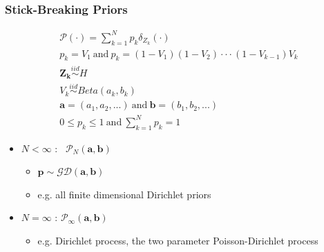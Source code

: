 	

\begin{frame} %
	\frametitle{Stick-Breaking Priors}
	\begin{center}
	\begin{align*}
		\mathscr{P}(\cdot)= \sum\limits_{k=1}^N
		\mathit{p_{k}}\delta_{Z_{k}}(\cdot) \\
		\mathit{p_{k}}=V_{1} \ \text{and} \  \mathit{p_{k}}=(1-V_{1})(1-V_{2}) \cdot \cdot \cdot(1-V_{k-1})V_{k} \\
		\mathbf{Z_{k}}  \stackrel{iid}{\sim} H \\
		V_{k}  \stackrel{iid}{\sim} Beta(a_{k},b_{k}) \\
		\mathbf{a}=(a_{1},a_{2},...) \ \text{and} \  \mathbf{b}=(b_{1},b_{2},...) \\
		0\leq\mathit{p_{k}}\leq1 \ \text{and} \ \sum\limits_{k=1}^N\mathit{p_{k}}=1 
	\end{align*}

	\end{center}
	
	    	\begin{itemize}
	    	    \item $N<\infty$ : \ $\mathscr{P}_{N}(\textbf{a},\textbf{b})$
	    	    \begin{itemize}
	    	        \item $\mathbf{p} \sim \mathscr{GD}(\textbf{a},\textbf{b})$
	    	        \item e.g. all finite dimensional Dirichlet priors
	    	    \end{itemize}
	    	    \item $N=\infty$ : $\mathscr{P}_{\infty}(\textbf{a},\textbf{b})$
	    	    \begin{itemize}
	    	        \item e.g. Dirichlet process, the two parameter Poisson-Dirichlet process
	    	    \end{itemize}
	    	\end{itemize}
\end{frame}


